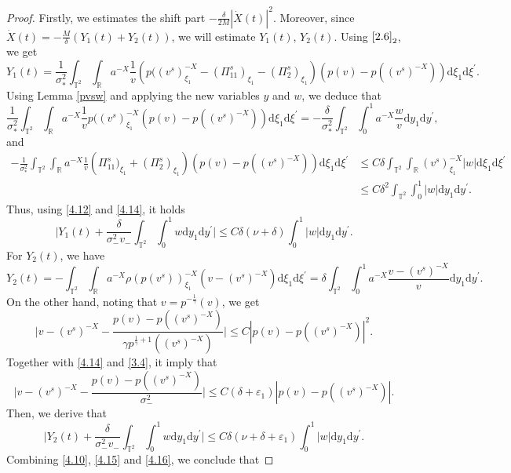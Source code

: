 \documentclass[10pt,reqno]{amsart}
\numberwithin{equation}{section}
\newcommand{\dif}{\mathrm{d}}
\begin{document}
\begin{proof}
Firstly, we estimates the shift part $-\frac{\delta}{2M}|\dot{X}(t)|^2$. Moreover, since $\dot{X}(t)=-\frac{M}{\delta}(Y_1(t)+Y_2(t))$, we will estimate $Y_1(t)$, $Y_2(t)$.
Using $\eqref{2.6}_2$, we get
\[
Y_1(t)=\frac{1}{\sigma_\ast^2}\int_{\mathbb{T}^2}\int_{\mathbb{R}}a^{-X}\frac{1}{v}
\left(p((v^s)^{-X}_{\xi_1}-(\Pi_{11}^s)_{\xi_1}-(\Pi_2^s)_{\xi_1}\right)
\left(p(v)-p((v^s)^{-X})\right)\dif \xi_1\dif \xi^{\prime}.
\]
Using Lemma \ref{pvsw} and applying the new variables $y$ and $w$, we deduce that
\[
\frac{1}{\sigma_\ast^2}\int_{\mathbb{T}^2}\int_{\mathbb{R}}a^{-X}\frac{1}{v}
p((v^s)^{-X}_{\xi_1}\left(p(v)-p((v^s)^{-X})\right)\dif \xi_1\dif \xi^{\prime}
=-\frac{\delta}{\sigma_\ast^2}\int_{\mathbb{T}^2}\int_0^1a^{-X}\frac{w}{v}\dif y_1\dif y^{\prime},
\]
and
\begin{align*}
-\frac{1}{\sigma_\ast^2}\int_{\mathbb{T}^2}\int_{\mathbb{R}}a^{-X}\frac{1}{v}
\left(\Pi_{11}^s)_{\xi_1}+(\Pi_2^s)_{\xi_1}\right)
\left(p(v)-p((v^s)^{-X})\right)\dif \xi_1\dif \xi^{\prime}
&\le C\delta\int_{\mathbb{T}^2}\int_{\mathbb{R}}(v^s)^{-X}_{\xi_1}|w|\dif \xi_1\dif \xi^{\prime}\\
&\le C\delta^2\int_{\mathbb{T}^2}\int_0^1|w|\dif y_1\dif y^{\prime}.
\end{align*}
Thus, using \eqref{4.12} and \eqref{4.14}, it holds
\begin{equation}\label{4.15}
\Big|Y_1(t)+\frac{\delta}{\sigma_-^2v_-}\int_{\mathbb{T}^2}\int_0^1w\dif y_1\dif y^{\prime}\Big|
\le C\delta(\nu+\delta)\int_0^1|w|\dif y_1\dif y^{\prime}.
\end{equation}
For $Y_2(t)$, we have
\[
Y_2(t)=-\int_{\mathbb{T}^2}\int_{\mathbb{R}}a^{-X}\rho\left(p(v^s)\right)_{\xi_1}^{-X}\left(v-(v^s)^{-X}\right)\dif \xi_1\dif\xi^{\prime}
=\delta\int_{\mathbb{T}^2}\int_0^1a^{-X}\frac{v-(v^s)^{-X}}{v}\dif y_1\dif y^{\prime}.
\]
On the other hand, noting that $v=p^{-\frac{1}{\gamma}}(v)$, we get
\[
\Big|v-(v^s)^{-X}-\frac{p(v)-p((v^s)^{-X})}{\gamma p^{\frac{1}{\gamma}+1}((v^s)^{-X})}\Big|
\le C|p(v)-p((v^s)^{-X})|^2.
\]
Together with \eqref{4.14} and \eqref{3.4}, it imply that
\[
\Big|v-(v^s)^{-X}-\frac{p(v)-p((v^s)^{-X})}{\sigma_-^2}\Big|
\le C(\delta+\varepsilon_1)|p(v)-p((v^s)^{-X})|.
\]
Then, we derive that
\begin{equation}\label{4.16}
\Big|Y_2(t)+\frac{\delta}{\sigma_-^2v_-}\int_{\mathbb{T}^2}\int_0^1w\dif y_1\dif y^{\prime}\Big|
\le C\delta(\nu+\delta+\varepsilon_1)\int_0^1|w|\dif y_1\dif y^{\prime}.
\end{equation}
Combining \eqref{4.10}, \eqref{4.15} and \eqref{4.16}, we conclude that

\end{proof}
\end{document}
